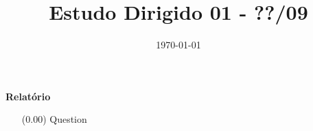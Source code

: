 \documentclass[a4paper]{article}
\date{\today}
\title{Estudo Dirigido 01 - ??/09}
\begin{document}
    \header{}

\textbf{Relatório}
\begin{center}
\begin{itemize}
  \item[(0.00)] Question
\end{itemize}
\end{center}

    \begin{answer}[Ítem 0.00]
    \end{answer}
\end{document}
